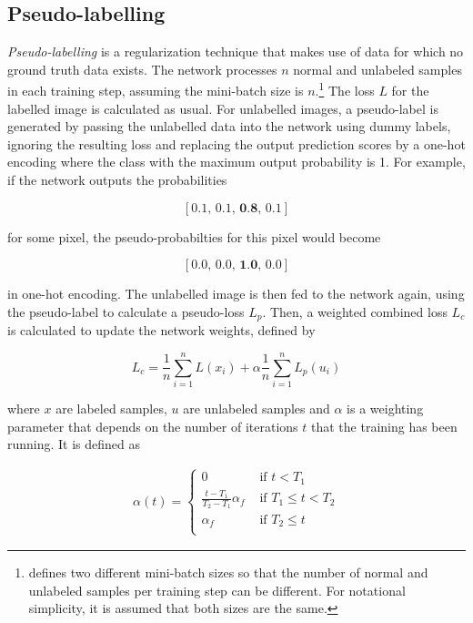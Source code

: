 	\subsection {Pseudo-labelling}
\label{subsec:pseudo_label}

\textit{Pseudo-labelling} \cite{pseudo_label} is a regularization technique that makes use of data for which no ground truth data exists. The network processes $n$ normal and unlabeled samples in each training step, assuming the mini-batch size is $n$.\footnote{\cite{pseudo_label} defines two different mini-batch sizes so that the number of normal and unlabeled samples per training step can be different. For notational simplicity, it is assumed that both sizes are the same.} The loss $L$ for the labelled image is calculated as usual. For unlabelled images, a pseudo-label is generated by passing the unlabelled data into the network using dummy labels, ignoring the resulting loss and replacing the output prediction scores by a one-hot encoding where the class with the maximum output probability is 1. For example, if the network outputs the probabilities 

\[ [0.1,\, 0.1,\, \textbf{0.8},\, 0.1] \]

\noindent for some pixel, the pseudo-probabilties for this pixel would become

\[ [0.0,\, 0.0,\, \textbf{1.0},\, 0.0] \]

\noindent in one-hot encoding. The unlabelled image is then fed to the network again, using the pseudo-label to calculate a pseudo-loss $L_p$. Then, a weighted combined loss $L_c$ is calculated to update the network weights, defined by

\[ L_c = \frac{1}{n} \sum \limits_{i=1}^{n} L(x_i) + \alpha \frac{1}{n} \sum \limits_{i=1}^{n} L_p(u_i)  \]

\noindent where $x$ are labeled samples, $u$ are unlabeled samples and $\alpha$ is a weighting parameter that depends on the number of iterations $t$ that the training has been running. It is defined as

\begin {align}
\alpha(t) = \begin{cases} 0 &\text{ if } t < T_1 \\
				\frac{t - T_1}{T_2 - T_1} \alpha_f &\text{ if } T_1 \leq t < T_2 \\
				\alpha_f &\text { if } T_2 \leq t \\
	        \end{cases}
\end {align}

